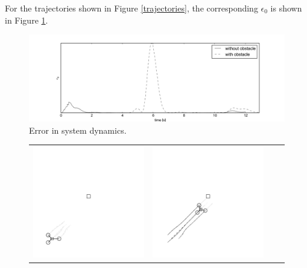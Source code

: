 \documentclass[letterpaper, 10 pt, conference]{ieeeconf}
\begin{document}
For the trajectories shown in Figure \ref{trajectories}, the corresponding $\epsilon_{0}$ is shown in Figure \ref{error}.
\begin{figure}[H]
	\centering
	\includegraphics[scale=0.3]{figures/epsilons.pdf}
	\caption{Error in system dynamics.}
	\label{error}
\end{figure}
\indent
\begin{figure}[t]
	\centering
	\setlength{\tabcolsep}{0.1em}
	\begin{tabular}[t]{|c|c|c|c|}
			\hline
				\includegraphics[scale=0.6]{figures/obstacle_0_tikz_gray.pdf} &
				\includegraphics[scale=0.6]{figures/obstacle_1_tikz_gray.pdf} &

\end{tabular}
\end{figure}
\end{document}
